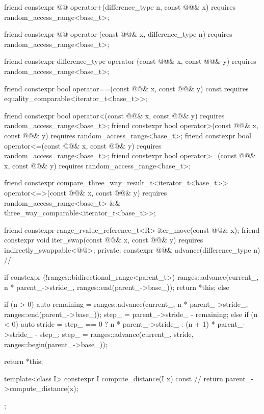 \begin{codeblock}
{{    friend constexpr @@ operator+(difference_type n, const @@& x)
      requires random_access_range<base_t>;

    friend constexpr @@ operator-(const @@& x, difference_type n)
      requires random_access_range<base_t>;

    friend constexpr difference_type operator-(const @@& x, const @@& y)
      requires random_access_range<base_t>;

    friend constexpr bool operator==(const @@& x, const @@& y) const
      requires equality_comparable<iterator_t<base_t>>;

    friend constexpr bool operator<(const @@& x, const @@& y)
      requires random_access_range<base_t>;
    friend constexpr bool operator>(const @@& x, const @@& y)
      requires random_access_range<base_t>;
    friend constexpr bool operator<=(const @@& x, const @@& y)
      requires random_access_range<base_t>;
    friend constexpr bool operator>=(const @@& x, const @@& y)
      requires random_access_range<base_t>;

    friend constexpr compare_three_way_result_t<iterator_t<base_t>>
      operator<=>(const @@& x, const @@& y)
        requires random_access_range<base_t> && three_way_comparable<iterator_t<base_t>>;

    friend constexpr range_rvalue_reference_t<R> iter_move(const @@& x);
    friend constexpr void iter_swap(const @@& x, const @@& y)
      requires indirectly_swappable<@@>;
  private:
    constexpr @@& advance(difference_type n) // \expos
    {
      if constexpr (!ranges::bidirectional_range<parent_t>) {
        ranges::advance(current_, n * parent_->stride_, ranges::end(parent_->base_));
        return *this;
      }
      else {
        if (n > 0) {
          auto remaining = ranges::advance(current_, n * parent_->stride_, ranges::end(parent_->base_));
          step_ = parent_->stride_ - remaining;
        }
        else if (n < 0) {
          auto stride = step_ == 0 ? n * parent_->stride_
                                   : (n + 1) * parent_->stride_ - step_;
          step_ = ranges::advance(current_, stride, ranges::begin(parent_->base_));
        }

        return *this;
      }
    }

    template<class I>
    constexpr I compute_distance(I x) const // \expos
    { return parent_->compute_distance(x); }
  };
}
\end{codeblock}

